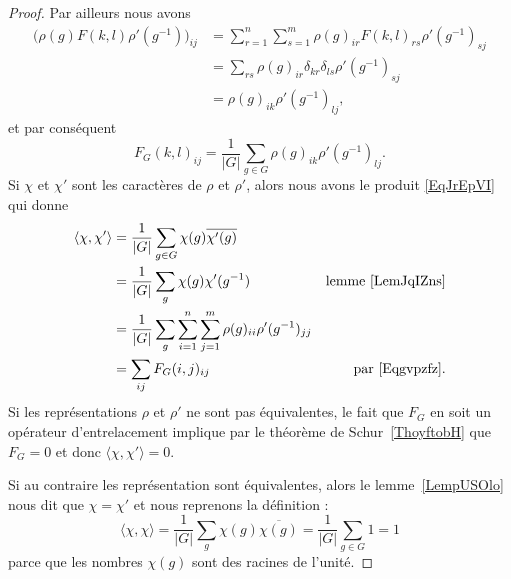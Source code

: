 \begin{proof}
	Par ailleurs nous avons
	\begin{subequations}
		\begin{align}
			\Big( \rho(g)F(k,l)\rho'(g^{-1}) \Big)_{ij} & =\sum_{r=1}^n\sum_{s=1}^m\rho(g)_{ir}F(k,l)_{rs}\rho'(g^{-1})_{sj} \\
			                                            & =\sum_{rs}\rho(g)_{ir}\delta_{kr}\delta_{ls}\rho'(g^{-1})_{sj}     \\
			                                            & =\rho(g)_{ik}\rho'(g^{-1})_{lj},
		\end{align}
	\end{subequations}
	et par conséquent
	\begin{equation}    \label{Eqgvpzfz}
		F_G(k,l)_{ij}=\frac{1}{ | G | }\sum_{g\in G}\rho(g)_{ik}\rho'(g^{-1})_{lj}.
	\end{equation}
	Si \( \chi\) et \( \chi'\) sont les caractères de \( \rho\) et \( \rho'\), alors nous avons le produit \eqref{EqJrEpVI} qui donne
	\begin{subequations}
		\begin{align}
			\langle \chi, \chi'\rangle & =\frac{1}{ | G | }\sum_{g\in G}\chi(g)\overline{ \chi'(g) }                                                                         \\
			                           & =\frac{1}{ | G | }\sum_g\chi(g)\chi'(g^{-1})                                                         & \text{lemme~\ref{LemJqIZns}} \\
			                           & =\frac{1}{ | G | }\sum_g\sum_{i=1}^n\sum_{j=1}^m\rho(g)_{ii}\rho'(g^{-1})_{jj}     \label{sEqKYywTM}                                \\
			                           & =\sum_{ij}F_G(i,j)_{ij}                                                                              & \text{par \eqref{Eqgvpzfz}}.
		\end{align}
	\end{subequations}
	Si les représentations \( \rho\) et \( \rho'\) ne sont pas équivalentes, le fait que \( F_G\) en soit un opérateur d'entrelacement implique par le théorème de Schur~\ref{ThoyftobH} que \( F_G=0\) et donc \( \langle \chi, \chi'\rangle =0\).

	Si au contraire les représentation sont équivalentes, alors le lemme~\ref{LempUSOlo} nous dit que \( \chi=\chi'\) et nous reprenons la définition :
	\begin{equation}
		\langle \chi, \chi\rangle =\frac{1}{ | G | }\sum_g\chi(g)\overline{ \chi(g) }=\frac{1}{ | G | }\sum_{g\in G}1=1
	\end{equation}
	parce que les nombres \( \chi(g)\) sont des racines de l'unité.
\end{proof}


